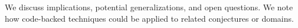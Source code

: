 We discuss implications, potential generalizations, and open questions. We note how code-backed techniques could be applied to related conjectures or domains.

